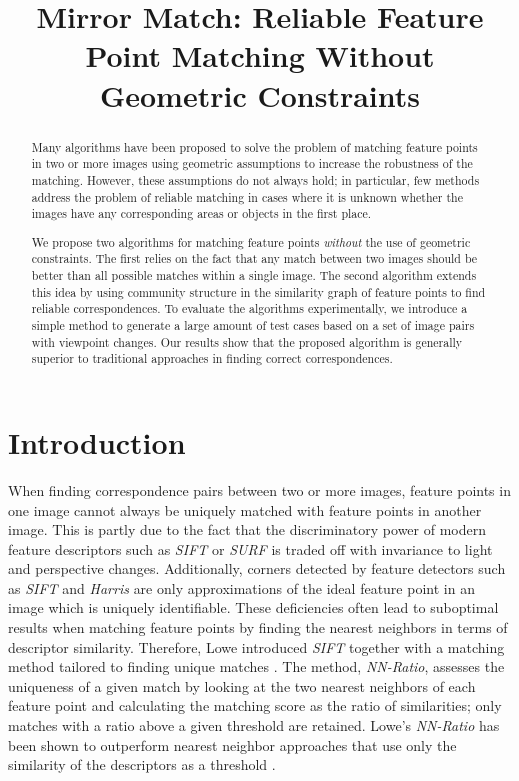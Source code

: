 \documentclass[conference]{IEEEtran}
\title{Mirror Match: Reliable Feature Point Matching Without Geometric 
Constraints}
\author{
\IEEEauthorblockN{
Jonas Toft Arnfred,\IEEEauthorrefmark{1}\IEEEauthorrefmark{2} Stefan Winkler,\IEEEauthorrefmark{1} Sabine S\"usstrunk\IEEEauthorrefmark{2}}
\vspace{1mm}
\IEEEauthorblockA{
\IEEEauthorrefmark{1}~Advanced Digital Sciences Center (ADSC), University of Illinois at Urbana-Champaign (UIUC), Singapore\\
\IEEEauthorrefmark{2}~\'Ecole Polytechnique F\'ed\'erale de Lausanne (EPFL), Switzerland}
}
\begin{document}
\maketitle
%
\begin{abstract}
Many algorithms have been proposed to solve the problem of matching 
feature points in two or more images using geometric assumptions to 
increase the robustness of the matching. However, these assumptions do not always hold; 
in particular, few methods address the problem of reliable matching in cases where it 
is unknown whether the images have any corresponding areas or objects in 
the first place. 

We propose two algorithms for matching feature points \emph{without} the use of 
geometric constraints. The first relies on the fact that any match 
between two images should be better than all possible matches within a 
single image. The second algorithm extends this idea by using community 
structure in the similarity graph of feature points to find reliable 
correspondences. To evaluate the algorithms experimentally, we introduce 
a simple method to generate a large amount of test cases based on a set 
of image pairs with viewpoint changes. Our results show that the 
proposed algorithm is generally superior to traditional approaches in 
finding correct correspondences.
\end{abstract}
%
\section{Introduction}
%
When finding correspondence pairs between two or more images, feature points in one image cannot always be 
uniquely matched with feature points in another image. This is partly 
due to the fact that the discriminatory power of modern feature 
descriptors such as \emph{SIFT} \cite{lowe2004sift} or \emph{SURF} 
\cite{bay2006surf} is traded off with invariance to light and 
perspective changes.  Additionally, corners detected by feature detectors 
such as \emph{SIFT} and \emph{Harris} \cite{harris1988combined} are only 
approximations of the ideal feature point in an image which is 
uniquely identifiable.  These deficiencies often lead to suboptimal results
when matching feature points by finding the nearest neighbors 
in terms of descriptor similarity.  Therefore, Lowe introduced \emph{SIFT} together with a 
matching method tailored to finding unique matches \cite{lowe2004sift}. 
The method, \emph{NN-Ratio}, assesses the uniqueness of a given match by looking at the two nearest neighbors of each 
feature point and calculating the matching score as the ratio of 
similarities; only matches with a ratio above a given threshold are retained. 
Lowe's \emph{NN-Ratio} has been shown to outperform nearest neighbor approaches that use only the similarity of the descriptors as a
threshold \cite{mikolajczyk2005performance}.
\end{document}
